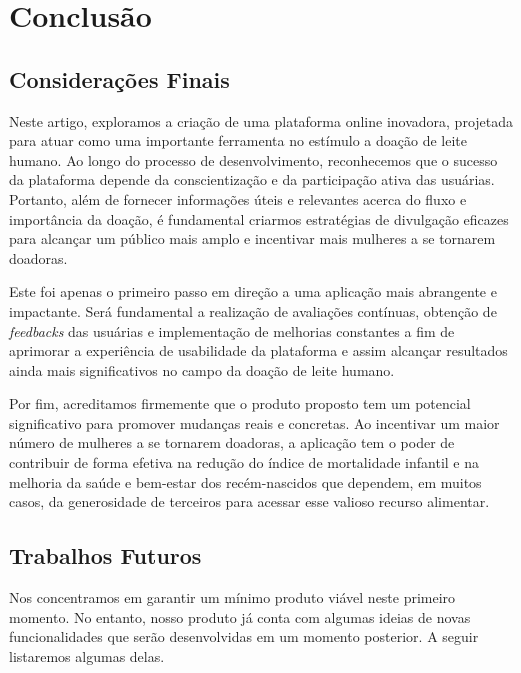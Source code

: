 \chapter{Conclusão}

\section{Considerações Finais}
Neste artigo, exploramos a criação de uma plataforma online inovadora, projetada para atuar como uma importante ferramenta no estímulo a doação de leite humano. 
Ao longo do processo de desenvolvimento, reconhecemos que o sucesso da plataforma depende da conscientização e da participação ativa das usuárias. Portanto, além de fornecer informações úteis e relevantes acerca do fluxo e importância da doação, é fundamental criarmos estratégias de divulgação eficazes para alcançar um público mais amplo e incentivar mais mulheres a se tornarem doadoras.

Este foi apenas o primeiro passo em direção a uma aplicação mais abrangente e impactante. Será fundamental a realização de avaliações contínuas, obtenção de \textit{feedbacks} das usuárias e implementação de melhorias constantes a fim de aprimorar a experiência de usabilidade da plataforma e assim alcançar resultados ainda mais significativos no campo da doação de leite humano.

Por fim, acreditamos firmemente que o produto proposto tem um potencial significativo para promover mudanças reais e concretas. Ao incentivar um maior número de mulheres a se tornarem doadoras, a aplicação tem o poder de contribuir de forma efetiva na redução do índice de mortalidade infantil e na melhoria da saúde e bem-estar dos recém-nascidos que dependem, em muitos casos, da generosidade de terceiros para acessar esse valioso recurso alimentar. 

\section{Trabalhos Futuros}
Nos concentramos em garantir um mínimo produto viável neste primeiro momento. No entanto, nosso produto já conta com algumas ideias de novas funcionalidades que serão desenvolvidas em um momento posterior. A seguir listaremos algumas delas.

